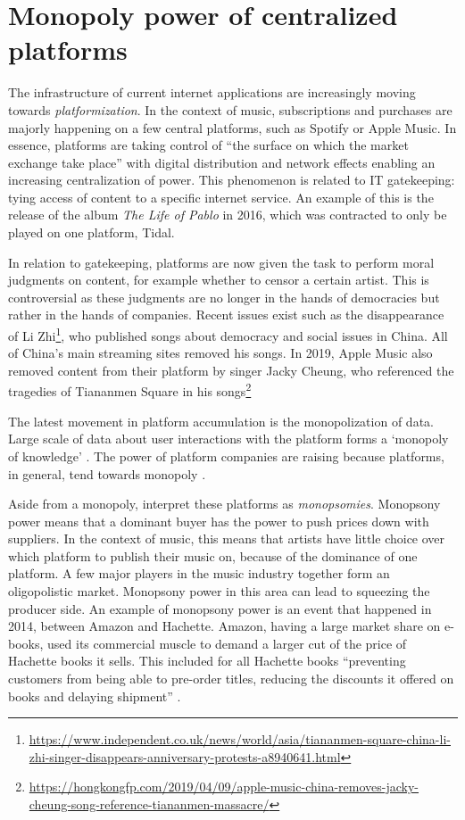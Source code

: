 \section{Monopoly power of centralized platforms}
The infrastructure of current internet applications are increasingly moving towards \textit{platformization}. In the context of music, subscriptions and purchases are majorly happening on a few central platforms, such as Spotify or Apple Music. In essence, platforms are taking control of ``the surface on which the market exchange take place'' \citep{andersson2016mastering} with digital distribution and network effects enabling an increasing centralization of power. This phenomenon is related to IT gatekeeping: tying access of content to a specific internet service. An example of this is the release of the album \textit{The Life of Pablo} in 2016, which was contracted to only be played on one platform, Tidal. 

\label{sec:problem-description-censoring}
In relation to gatekeeping, platforms are now given the task to perform moral judgments on content, for example whether to censor a certain artist. This is controversial as these judgments are no longer in the hands of democracies but rather in the hands of companies. Recent issues exist such as the disappearance of Li Zhi\footnote{\url{https://www.independent.co.uk/news/world/asia/tiananmen-square-china-li-zhi-singer-disappears-anniversary-protests-a8940641.html}}, who published songs about democracy and social issues in China. All of China's main streaming sites removed his songs. In 2019, Apple Music also removed content from their platform by singer Jacky Cheung, who referenced the tragedies of Tiananmen Square in his songs\footnote{\url{https://hongkongfp.com/2019/04/09/apple-music-china-removes-jacky-cheung-song-reference-tiananmen-massacre/}}

The latest movement in platform accumulation is the monopolization of data. Large scale of data about user interactions with the platform forms a `monopoly of knowledge' \citep{innis2007empire}. The power of platform companies are raising because platforms, in general, tend towards monopoly \citep{srnicek2017platform}. 

Aside from a monopoly, \cite{rayna2009monometapoly} interpret these platforms as \textit{monopsomies}. Monopsony power means that a dominant buyer has the power to push prices down with suppliers. In the context of music, this means that artists have little choice over which platform to publish their music on, because of the dominance of one platform. A few major players in the music industry together form an oligopolistic market. Monopsony power in this area can lead to squeezing the producer side. An example of monopsony power is an event that happened in 2014, between Amazon and Hachette. Amazon, having a large market share on e-books, used its commercial muscle to demand a larger cut of the price of Hachette books it sells. This included for all Hachette books ``preventing customers from being able to pre-order titles, reducing the discounts it offered on books and delaying shipment'' \citep{theguardian2014amazon}. 

